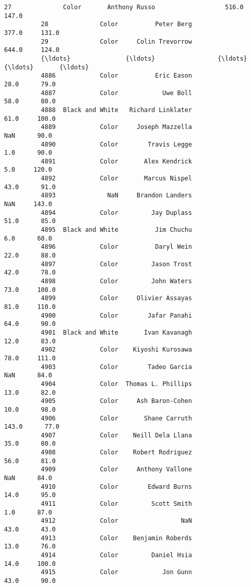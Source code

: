 \documentclass[11pt]{article}
\begin{document}
\begin{Verbatim}[commandchars=\\\{\}]
          27              Color       Anthony Russo                   516.0     147.0   
          28              Color          Peter Berg                   377.0     131.0   
          29              Color     Colin Trevorrow                   644.0     124.0   
          {\ldots}               {\ldots}                 {\ldots}                     {\ldots}       {\ldots}   
          4886            Color          Eric Eason                    28.0      79.0   
          4887            Color            Uwe Boll                    58.0      80.0   
          4888  Black and White   Richard Linklater                    61.0     100.0   
          4889            Color     Joseph Mazzella                     NaN      90.0   
          4890            Color        Travis Legge                     1.0      90.0   
          4891            Color       Alex Kendrick                     5.0     120.0   
          4892            Color       Marcus Nispel                    43.0      91.0   
          4893              NaN     Brandon Landers                     NaN     143.0   
          4894            Color         Jay Duplass                    51.0      85.0   
          4895  Black and White          Jim Chuchu                     6.0      60.0   
          4896            Color          Daryl Wein                    22.0      88.0   
          4897            Color         Jason Trost                    42.0      78.0   
          4898            Color         John Waters                    73.0     108.0   
          4899            Color     Olivier Assayas                    81.0     110.0   
          4900            Color        Jafar Panahi                    64.0      90.0   
          4901  Black and White       Ivan Kavanagh                    12.0      83.0   
          4902            Color    Kiyoshi Kurosawa                    78.0     111.0   
          4903            Color        Tadeo Garcia                     NaN      84.0   
          4904            Color  Thomas L. Phillips                    13.0      82.0   
          4905            Color     Ash Baron-Cohen                    10.0      98.0   
          4906            Color       Shane Carruth                   143.0      77.0   
          4907            Color    Neill Dela Llana                    35.0      80.0   
          4908            Color    Robert Rodriguez                    56.0      81.0   
          4909            Color     Anthony Vallone                     NaN      84.0   
          4910            Color        Edward Burns                    14.0      95.0   
          4911            Color         Scott Smith                     1.0      87.0   
          4912            Color                 NaN                    43.0      43.0   
          4913            Color    Benjamin Roberds                    13.0      76.0   
          4914            Color         Daniel Hsia                    14.0     100.0   
          4915            Color            Jon Gunn                    43.0      90.0   
          

\end{Verbatim}
\end{document}
